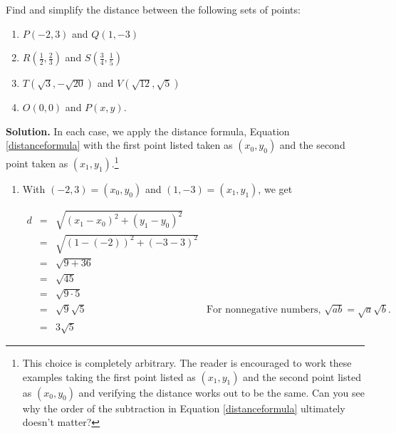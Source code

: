 \documentclass{ximera}
\begin{document}
\begin{example} \label{distanceexample1} Find and simplify the distance between the following sets of points:

\begin{enumerate}

\item $P(-2,3)$ and  $Q(1,-3)$ 

\item $R\left( \frac{1}{2}, \frac{2}{3}\right)$ and $S\left( \frac{3}{4}, \frac{1}{5}\right)$ 

\item  $T(\sqrt{3}, -\sqrt{20})$ and $V(\sqrt{12}, \sqrt{5})$

\item   $O(0,0)$ and $P(x,y)$. 

\end{enumerate}


{\bf Solution.}  In each case, we apply the distance formula, Equation \ref{distanceformula} with the first point listed taken as  $\left(x_0, y_0\right)$ and the second point taken as $\left(x_1, y_1\right)$.\footnote{This choice is completely arbitrary.  The reader is encouraged to work these examples taking the first point listed as $\left(x_1, y_1\right)$ and the second point listed as $\left(x_0, y_0\right)$ and verifying the distance works out to be the same.  Can you see why the order of the subtraction in Equation \ref{distanceformula} ultimately doesn't matter?}

\begin{enumerate}

\item With $(-2,3) =  \left(x_0, y_0\right)$ and  $(1,-3) = \left(x_1, y_1\right)$, we get

\setlength{\extrarowheight}{3pt}

\[ \begin{array}{rclr}

 d & = & \sqrt{\left(x_1 - x_0 \right)^2 + \left(y_1 - y_0 \right)^2} & \\
   & = & \sqrt{ (1-(-2))^2 + (-3-3)^2} & \\
   & = & \sqrt{9 + 36} & \\
   & = & \sqrt{45} & \\
   & = & \sqrt{9 \cdot 5} & \\
   & = & \sqrt{9} \sqrt{5} & \text{For nonnegative numbers, $\sqrt{ab} = \sqrt{a} \sqrt{b}$.} \\
   & = & 3 \sqrt{5} &  \end{array} \]


\end{enumerate}
\end{example}
\end{document}
